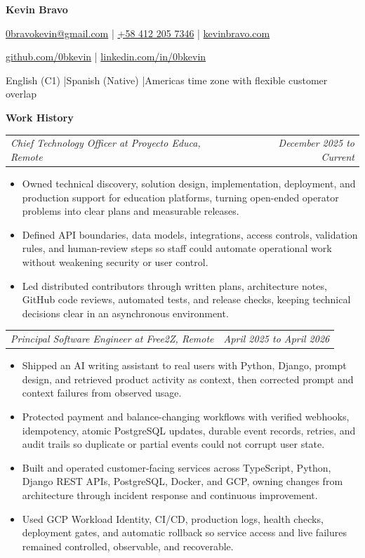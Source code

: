 \documentclass[10pt,letterpaper]{article}
\makeatletter
\newcommand{\bodyfont}{\fontsize{10.5}{15.75}\selectfont}
\newcommand{\contactfont}{\fontsize{12}{15}\selectfont}
\newcommand{\sectiontitle}[1]{%
  \vspace{4pt}
  {\bodyfont\textbf{#1}}\par
  \nopagebreak[4]
  \vspace{2pt}
}
\newcommand{\roleline}[2]{%
  \begin{tabularx}{\textwidth}{@{}Xr@{}}
    \bodyfont\textit{#1} & \bodyfont\textit{#2}
  \end{tabularx}
  \nopagebreak[4]
  \vspace{1pt}
}
\makeatother
\begin{document}
\bodyfont
\raggedright

\begin{center}
  {\fontsize{14}{17}\selectfont\textbf{Kevin Bravo}}\par
  \vspace{3pt}
  {\contactfont
    \href{mailto:0bravokevin@gmail.com}{0bravokevin@gmail.com}
    \enspace|\enspace
    \href{tel:+584122057346}{+58 412 205 7346}
    \enspace|\enspace
    \href{https://kevinbravo.com}{kevinbravo.com}
  }\par
  {\contactfont
    \href{https://github.com/0bkevin}{github.com/0bkevin}
    \enspace|\enspace
    \href{https://www.linkedin.com/in/0bkevin/}{linkedin.com/in/0bkevin}
  }\par
  {\contactfont English (C1) \enspace|\enspace Spanish (Native) \enspace|\enspace Americas time zone with flexible customer overlap}
\end{center}

\sectiontitle{Work History}

\roleline{Chief Technology Officer at Proyecto Educa, Remote}{December 2025 to Current}
\begin{itemize}
  \item Owned technical discovery, solution design, implementation, deployment, and production support for education platforms, turning open-ended operator problems into clear plans and measurable releases.
  \item Defined API boundaries, data models, integrations, access controls, validation rules, and human-review steps so staff could automate operational work without weakening security or user control.
  \item Led distributed contributors through written plans, architecture notes, GitHub code reviews, automated tests, and release checks, keeping technical decisions clear in an asynchronous environment.
\end{itemize}

\vspace{3pt}
\roleline{Principal Software Engineer at Free2Z, Remote}{April 2025 to April 2026}
\begin{itemize}
  \item Shipped an AI writing assistant to real users with Python, Django, prompt design, and retrieved product activity as context, then corrected prompt and context failures from observed usage.
  \item Protected payment and balance-changing workflows with verified webhooks, idempotency, atomic PostgreSQL updates, durable event records, retries, and audit trails so duplicate or partial events could not corrupt user state.
  \item Built and operated customer-facing services across TypeScript, Python, Django REST APIs, PostgreSQL, Docker, and GCP, owning changes from architecture through incident response and continuous improvement.
  \item Used GCP Workload Identity, CI/CD, production logs, health checks, deployment gates, and automatic rollback so service access and live failures remained controlled, observable, and recoverable.
\end{itemize}
\end{document}
